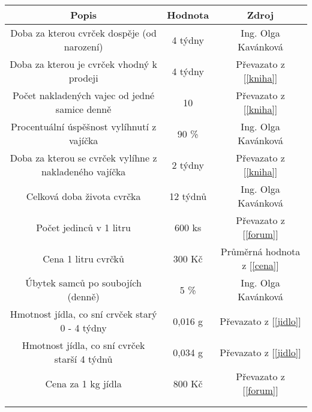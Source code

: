 \documentclass{article}
\begin{document}
    \begin{table}[h]
        \begin{tabular}{|c|c|c|}
        \hline
        \textbf{Popis}                                         & \textbf{Hodnota}      & \textbf{Zdroj}                                       \\ \hline
        Doba za kterou cvrček dospěje (od narození)            & 4 týdny               & Ing. Olga Kavánková                                  \\ \hline
        Doba za kterou je cvrček vhodný k prodeji              & 4 týdny               & Převazato z [\ref{kniha}]                            \\ \hline
        Počet nakladených vajec od jedné samice denně          & 10                    & Převazato z [\ref{kniha}]                            \\ \hline
        Procentuální úspěšnost vylíhnutí z vajíčka             & 90 \%                 & Ing. Olga Kavánková                                  \\ \hline
        Doba za kterou se cvrček vylíhne z nakladeného vajíčka & 2 týdny               & Převazato z [\ref{kniha}]                            \\ \hline
        Celková doba života cvrčka                             & 12 týdnů              & Ing. Olga Kavánková                                  \\ \hline
        Počet jedinců v 1 litru                                & 600 ks                & Převazato z [\ref{forum}]                            \\ \hline
        Cena 1 litru cvrčků                                    & 300 Kč                & Průměrná hodnota z [\ref{cena}]                      \\ \hline
        Úbytek samců po soubojích (denně)                      & 5 \%                  & Ing. Olga Kavánková                                  \\ \hline
        Hmotnost jídla, co sní crvček starý 0 - 4 týdny        & 0,016 g               & Převazato z [\ref{jidlo}]                            \\ \hline
        Hmotnost jídla, co sní cvrček starší 4 týdnů           & 0,034 g               & Převazato z [\ref{jidlo}]                            \\ \hline
        Cena za 1 kg jídla                                     & 800 Kč                & Převazato z [\ref{forum}]                            \\ \hline
        \multicolumn{1}{|l|}{}                                 & \multicolumn{1}{l|}{} & \multicolumn{1}{l|}{}                                \\ \hline
        \multicolumn{1}{|l|}{}                                 & \multicolumn{1}{l|}{} & \multicolumn{1}{l|}{}                                \\ \hline
        \end{tabular}
    \end{table}
\end{document}
